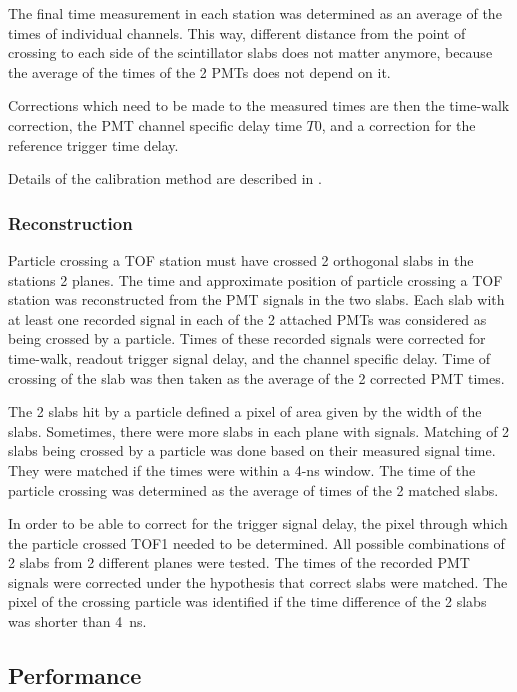 The final time measurement in each station was determined as an average of
the times of individual channels. This way, different distance from
the point of crossing to each side of the scintillator slabs does not
matter anymore, because the average of the times of the 2 PMTs does
not depend on it.

Corrections which need to be made to the measured times are then the
time-walk correction, the PMT channel specific delay time $T0$, and
a correction for the reference trigger time delay.

Details of the calibration method are described in \cite{NOTE251}.

\subsubsection{Reconstruction}

Particle crossing a TOF station must have crossed 2 orthogonal slabs
in the stations 2 planes.  The time and approximate position of
particle crossing a TOF station was reconstructed from the PMT signals
in the two slabs. Each slab with at least one recorded signal in each
of the 2 attached PMTs was considered as being crossed by a
particle. Times of these recorded signals were corrected for
time-walk, readout trigger signal delay, and the channel specific
delay. Time of crossing of the slab was then taken as the average of
the 2 corrected PMT times.

The 2 slabs hit by a particle defined a pixel of area given by the
width of the slabs. Sometimes, there were more slabs in each plane
with signals. Matching of 2 slabs being crossed by a particle was done
based on their measured signal time. They were matched if the times
were within a 4-ns window. The time of the particle crossing was
determined as the average of times of the 2 matched slabs.


In order to be able to correct for the trigger signal delay, the pixel
through which the particle crossed TOF1 needed to be determined. All
possible combinations of 2 slabs from 2 different planes were
tested. The times of the recorded PMT signals were corrected under the
hypothesis that correct slabs were matched. The pixel of the crossing
particle was identified if the time difference of the 2 slabs was
shorter than 4~ns.


\subsection{Performance}
\label{SubSect:TOF_Performance}

